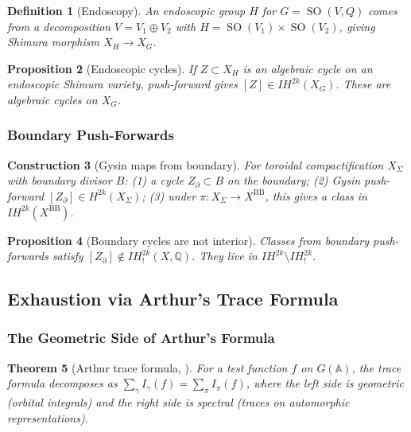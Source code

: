 \documentclass[12pt]{amsart}
\newtheorem{theorem}{Theorem}[section]
\newtheorem{proposition}[theorem]{Proposition}
\newtheorem{definition}[theorem]{Definition}
\newtheorem{construction}[theorem]{Construction}
\theoremstyle{definition}
\DeclareMathOperator\SO{SO}
\newcommand{\A}{\mathbb{A}}
\newcommand{\Q}{\mathbb{Q}}
\newcommand{\IH}{\mathit{IH}}
\begin{document}
\begin{definition}[Endoscopy]
An endoscopic group $H$ for $G = \SO(V, Q)$ comes from a decomposition $V = V_1 \oplus V_2$ with $H = \SO(V_1) \times \SO(V_2)$, giving Shimura morphism $X_H \to X_G$.
\end{definition}

\begin{proposition}[Endoscopic cycles]
If $Z \subset X_H$ is an algebraic cycle on an endoscopic Shimura variety, push-forward gives $[Z] \in \IH^{2k}(X_G)$. These are algebraic cycles on $X_G$.
\end{proposition}

\subsubsection{Boundary Push-Forwards}

\begin{construction}[Gysin maps from boundary]
For toroidal compactification $X_{\Sigma}$ with boundary divisor $B$: (1) a cycle $Z_{\partial} \subset B$ on the boundary; (2) Gysin push-forward $[Z_{\partial}] \in H^{2k}(X_{\Sigma})$; (3) under $\pi \colon X_{\Sigma} \to X^{\mathrm{BB}}$, this gives a class in $\IH^{2k}(X^{\mathrm{BB}})$.
\end{construction}

\begin{proposition}[Boundary cycles are not interior]
Classes from boundary push-forwards satisfy $[Z_{\partial}] \notin \IH^{2k}_!(X, \Q)$. They live in $\IH^{2k} \setminus \IH^{2k}_!$.
\end{proposition}

\subsection{Exhaustion via Arthur's Trace Formula}

\subsubsection{The Geometric Side of Arthur's Formula}

\begin{theorem}[Arthur trace formula, \cite{Arthur}]
For a test function $f$ on $G(\A)$, the trace formula decomposes as $\sum_{\gamma} I_{\gamma}(f) = \sum_{\pi} I_{\pi}(f)$, where the left side is geometric (orbital integrals) and the right side is spectral (traces on automorphic representations).
\end{theorem}
\end{document}
